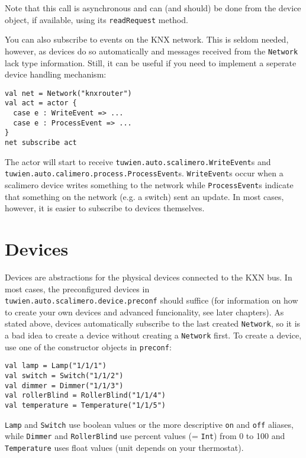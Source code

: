 Note that this call is asynchronous and can (and should) be done from the device object, if available, using its \lstinline!readRequest! method.

You can also subscribe to events on the KNX network. This is seldom needed, however, as devices do so automatically and messages received from the \lstinline!Network! lack type information. Still, it can be useful if you need to implement a seperate device handling mechanism:

\begin{lstlisting}
val net = Network("knxrouter")
val act = actor {
  case e : WriteEvent => ...
  case e : ProcessEvent => ...
}
net subscribe act
\end{lstlisting}

The actor will start to receive \lstinline!tuwien.auto.scalimero.WriteEvent!s and \lstinline!tuwien.auto.calimero.process.ProcessEvent!s. \lstinline!WriteEvent!s occur when a scalimero device writes something to the network while \lstinline!ProcessEvent!s indicate that something on the network (e.g. a switch) sent an update. In most cases, however, it is easier to subscribe to devices themselves.

\section{Devices}

Devices are abstractions for the physical devices connected to the KXN bus. In most cases, the preconfigured devices in \lstinline!tuwien.auto.scalimero.device.preconf! should suffice (for information on how to create your own devices and advanced funcionality, see later chapters). As stated above, devices automatically subscribe to the last created \lstinline!Network!, so it is a bad idea to create a device without creating a \lstinline!Network! first. To create a device, use one of the constructor objects in \lstinline!preconf!:

\begin{lstlisting}
val lamp = Lamp("1/1/1")
val switch = Switch("1/1/2")
val dimmer = Dimmer("1/1/3")
val rollerBlind = RollerBlind("1/1/4")
val temperature = Temperature("1/1/5")
\end{lstlisting}

\lstinline!Lamp! and \lstinline!Switch! use boolean values or the more descriptive \lstinline!on! and \lstinline!off! aliases, while \lstinline!Dimmer! and \lstinline!RollerBlind! use percent values (= \lstinline!Int!) from 0 to 100 and \lstinline!Temperature! uses float values (unit depends on your thermostat).

